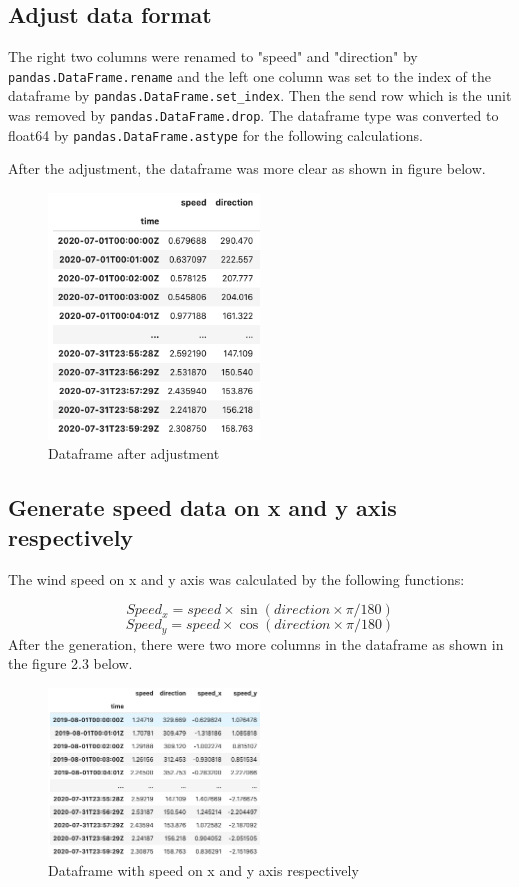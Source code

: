 \documentclass[10pt]{report}
\begin{document}
\subsection{Adjust data format}
The right two columns were renamed to "speed" and "direction" by \texttt{pandas.DataFrame.rename} and the left one column was set to the index of the dataframe by \texttt{pandas.DataFrame.set\_index}. Then the send row which is the unit was removed by \texttt{pandas.DataFrame.drop}. The dataframe type was converted to float64 by \texttt{pandas.DataFrame.astype} for the following calculations.\par
After the adjustment, the dataframe was more clear as shown in figure below.\par
\begin{figure}[h!]
    \centering
    \includegraphics[width=0.50\textwidth]{images/processed_dataframe.png}
    \caption{Dataframe after adjustment}
    \label{fig: PaleBlueDot}    
\end{figure}
\subsection{Generate speed data on x and y axis respectively}
The wind speed on x and y axis was calculated by the following functions:\par
\[Speed_x = speed \times \sin(direction \times \pi / 180)\]
\[Speed_y = speed \times \cos(direction \times \pi / 180)\]
After the generation, there were two more columns in the dataframe as shown in the figure 2.3 below.\par
\begin{figure}[h!]
    \centering
    \includegraphics[width=0.50\textwidth]{images/processed_dataframe_xy.png}
    \caption{Dataframe with speed on x and y axis respectively}
    \label{fig: PaleBlueDot}    
\end{figure}
\end{document}
